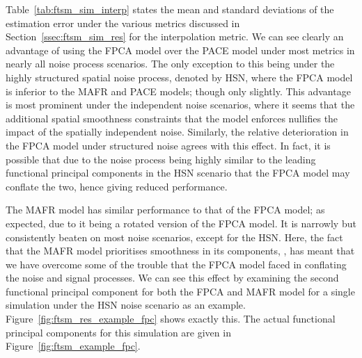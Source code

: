 Table~\ref{tab:ftsm_sim_interp} states the mean and standard deviations of the estimation error under the various metrics discussed in Section~\ref{ssec:ftsm_sim_res} for the interpolation metric.
We can see clearly an advantage of using the FPCA model over the PACE model under most metrics in nearly all noise process scenarios.
The only exception to this being under the highly structured spatial noise process, denoted by HSN, where the FPCA model is inferior to the MAFR and PACE models; though only slightly.
This advantage is most prominent under the independent noise scenarios, where it seems that the additional spatial smoothness constraints that the model enforces nullifies the impact of the spatially independent noise.
Similarly, the relative deterioration in the FPCA model under structured noise agrees with this effect.
In fact, it is possible that due to the noise process being highly similar to the leading functional principal components in the HSN scenario that the FPCA model may conflate the two, hence giving reduced performance.

The MAFR model has similar performance to that of the FPCA model; as expected, due to it being a rotated version of the FPCA model.
It is narrowly but consistently beaten on most noise scenarios, except for the HSN.
Here, the fact that the MAFR model prioritises smoothness in its components, \citep{hooker_maximal_2016}, has meant that we have overcome some of the trouble that the FPCA model faced in conflating the noise and signal processes. 
We can see this effect by examining the second functional principal component for both the FPCA and MAFR model for a single simulation under the HSN noise scenario as an example.
Figure~\ref{fig:ftsm_res_example_fpc} shows exactly this.
The actual functional principal components for this simulation are given in Figure~\ref{fig:ftsm_example_fpc}.

